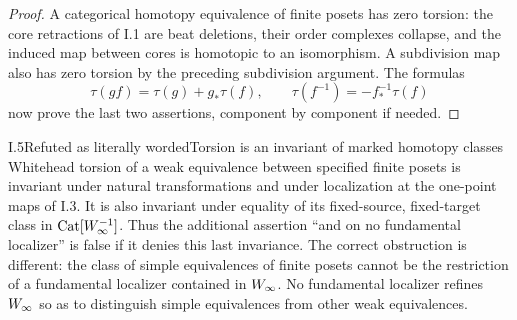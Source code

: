 \begin{proof}
A categorical homotopy equivalence of finite posets has zero torsion:
the core retractions of I.1 are beat deletions, their order complexes
collapse, and the induced map between cores is homotopic to an
isomorphism. A subdivision map also has zero torsion by the preceding
subdivision argument. The formulas
\[
 \tau(gf)=\tau(g)+g_*\tau(f),\qquad
 \tau(f^{-1})=-f_*^{-1}\tau(f)
\]
now prove the last two assertions, component by component if needed.
\end{proof}

\begin{claim}{I.5}{Refuted as literally worded}{Torsion is an invariant of marked homotopy classes}
Whitehead torsion of a weak equivalence between specified finite posets
is invariant under natural transformations and under localization at
the one-point maps of I.3. It is also invariant under equality of its
fixed-source, fixed-target class in $\mathrm{Cat}[W_\infty^{-1}]$.
Thus the additional assertion ``and on no fundamental localizer'' is
false if it denies this last invariance. The correct obstruction is
different: the class of simple equivalences of finite posets cannot be
the restriction of a fundamental localizer contained in $W_\infty$.
No fundamental localizer refines $W_\infty$ so as to distinguish simple
equivalences from other weak equivalences.
\end{claim}
